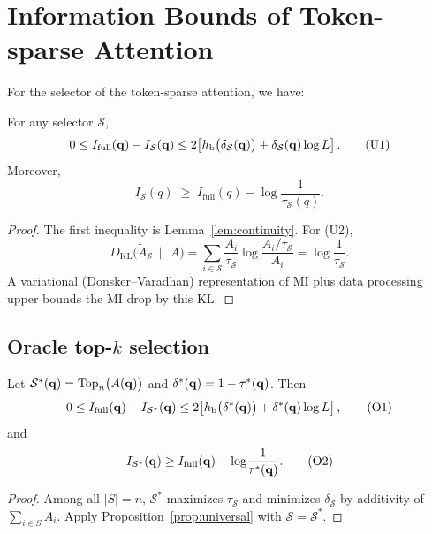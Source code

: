 \section{Information Bounds of Token-sparse Attention}
\label{sec:app_mib_tsa}
For the selector of the token-sparse attention, we have:

\begin{proposition}
\label{prop:universal}
For any selector $\mathcal S$,
\begin{equation}
0 \le I_{\mathrm{full}}(\mathbf{q})-I_{\mathcal S}(\mathbf{q})
\le 2\!\left[h_{\mathrm b}\big(\delta_{\mathcal S}(\mathbf{q})\big)+\delta_{\mathcal S}(\mathbf{q})\log L\right].
\tag{U1}
\end{equation}
Moreover,
\begin{equation}
I_{\mathcal S}(q)\;\ge\; I_{\mathrm{full}}(q) - \log\!\frac{1}{\tau_{\mathcal S}(q)}.
\tag{U2}
\end{equation}
\begin{proof}
The first inequality is Lemma~\ref{lem:continuity}. For (U2),
\[
D_{\mathrm{KL}}\!\big(\widetilde A_{\mathcal S}\,\|\,A\big)
=\sum_{i\in\mathcal S}\frac{A_i}{\tau_{\mathcal S}}
\log\frac{A_i/\tau_{\mathcal S}}{A_i}
= \log\frac{1}{\tau_{\mathcal S}}.
\]
A variational (Donsker–Varadhan) representation of MI plus data processing upper bounds the MI drop by this KL.
\end{proof}
\end{proposition}

\subsection{\texorpdfstring{Oracle top-$k$ selection}{Oracle top-k selection}}

\begin{theorem}
\label{thm:oracle}
Let $\mathcal S^{*}(\mathbf{q})=\operatorname*{Top}_n\!\big(A(\mathbf{q})\big)$ and $\delta^{*}(\mathbf{q})=1-\tau^{*}(\mathbf{q})$. Then
\begin{equation}
0 \le I_{\mathrm{full}}(\mathbf{q})-I_{\mathcal S^{*}}(\mathbf{q})
\le 2\!\left[h_{\mathrm b}\big(\delta^{*}(\mathbf{q})\big)+\delta^{*}(\mathbf{q})\log L\right],
\tag{O1}
\end{equation}
and
\begin{equation}
I_{\mathcal S^{*}}(\mathbf{q})\ge I_{\mathrm{full}}(\mathbf{q})-\log\!\frac{1}{\tau^{*}(\mathbf{q})}.
\tag{O2}
\end{equation}
\begin{proof}
Among all $|S|{=}n$, $\mathcal S^{*}$ maximizes $\tau_{\mathcal S}$ and minimizes $\delta_{\mathcal S}$ by additivity of $\sum_{i\in S}A_i$. Apply Proposition~\ref{prop:universal} with $\mathcal S{=}\mathcal S^{*}$.
\end{proof}
\end{theorem}

